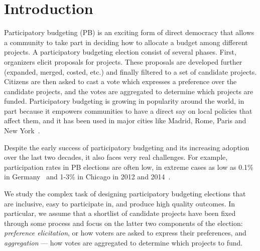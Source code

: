 \documentclass[twoside,11pt]{article}
\begin{document}
\section{Introduction}\label{sec:intro}


Participatory budgeting (PB) is an exciting form of direct democracy that allows a community to take part in deciding how to allocate a budget among different projects. 
%
A participatory budgeting election  consist of several phases. First, organizers elicit proposals for  projects. These proposals are developed further (expanded, merged, costed, etc.) and finally filtered to a set of candidate projects.  Citizens are then asked to cast a vote which expresses a preference over the candidate projects, and the votes are aggregated to determine which projects are funded.
%
Participatory budgeting is growing in popularity around the world, in part because it empowers communities to have a direct say on local policies that affect them,  and it has been used  in major cities like Madrid, Rome, Paris and New York~\cite{sintomer2008participatory,su2017porto}.  %

Despite the early success of participatory budgeting and its increasing adoption over the last two decades, it also faces very real challenges. 
For example, participation rates in PB elections are often low, in  extreme cases as low as 0.1\% in Germany~\cite{zepic2017participatory} and 1-3\%   in Chicago in 2012 and 2014~\cite{stewart2014participatory,carroll2016democratizing}. 

We study the complex task of  designing  participatory budgeting elections that are inclusive, easy to participate in, and produce high quality outcomes.   In particular, we assume that a shortlist of candidate projects have been fixed through some process and focus on the latter two components of the election: \emph{preference elicitation}, or how voters are asked to express their preferences, and \emph{aggregation} --- how votes are aggregated to determine which projects to fund. 
\end{document}

